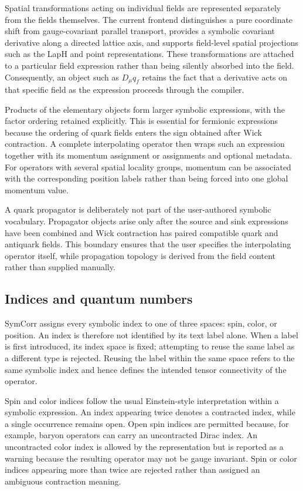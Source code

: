 \documentclass[11pt]{article}
\begin{document}
Spatial transformations acting on individual fields are represented separately
from the fields themselves. The current frontend distinguishes a pure
coordinate shift from gauge-covariant parallel transport, provides a symbolic
covariant derivative along a directed lattice axis, and supports field-level
spatial projections such as the LapH and point representations. These
transformations are attached to a particular field expression rather than being
silently absorbed into the field. Consequently, an object such as
\(D_\mu q_f\) retains the fact that a derivative acts on that specific field as
the expression proceeds through the compiler.

Products of the elementary objects form larger symbolic expressions, with the
factor ordering retained explicitly. This is essential for fermionic
expressions because the ordering of quark fields enters the sign obtained after
Wick contraction. A complete interpolating operator then wraps such an
expression together with its momentum assignment or assignments and optional
metadata. For operators with several spatial locality groups, momentum can be
associated with the corresponding position labels rather than being forced into
one global momentum value.

A quark propagator is deliberately not part of the user-authored symbolic
vocabulary. Propagator objects arise only after the source and sink expressions
have been combined and Wick contraction has paired compatible quark and
antiquark fields. This boundary ensures that the user specifies the
interpolating operator itself, while propagation topology is derived from the
field content rather than supplied manually.

\subsection{Indices and quantum numbers}

SymCorr assigns every symbolic index to one of three spaces: spin, color, or
position. An index is therefore not identified by its text label alone. When a
label is first introduced, its index space is fixed; attempting to reuse the
same label as a different type is rejected. Reusing the label within the same
space refers to the same symbolic index and hence defines the intended tensor
connectivity of the operator.

Spin and color indices follow the usual Einstein-style interpretation within a
symbolic expression. An index appearing twice denotes a contracted index, while
a single occurrence remains open. Open spin indices are permitted because, for
example, baryon operators can carry an uncontracted Dirac index. An uncontracted
color index is allowed by the representation but is reported as a warning
because the resulting operator may not be gauge invariant. Spin or color
indices appearing more than twice are rejected rather than assigned an
ambiguous contraction meaning.
\end{document}
